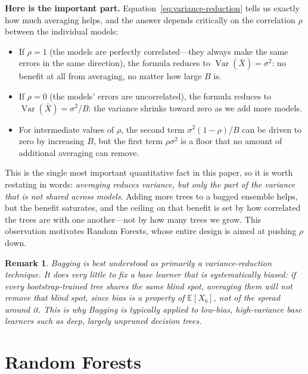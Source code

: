 \documentclass[12pt,a4paper]{article}
\newtheorem{remark}{Remark}[section]
\begin{document}
\textbf{Here is the important part.} Equation~\eqref{eq:variance-reduction} tells us exactly how much averaging helps, and the answer depends critically on the correlation $\rho$ between the individual models:

\begin{itemize}[nosep]
    \item If $\rho = 1$ (the models are perfectly correlated---they always make the same errors in the same direction), the formula reduces to $\operatorname{Var}(\bar X) = \sigma^2$: no benefit at all from averaging, no matter how large $B$ is.
    \item If $\rho = 0$ (the models' errors are uncorrelated), the formula reduces to $\operatorname{Var}(\bar X) = \sigma^2 / B$: the variance shrinks toward zero as we add more models.
    \item For intermediate values of $\rho$, the second term $\sigma^2(1-\rho)/B$ can be driven to zero by increasing $B$, but the first term $\rho \sigma^2$ is a floor that no amount of additional averaging can remove.
\end{itemize}

This is the single most important quantitative fact in this paper, so it is worth restating in words: \emph{averaging reduces variance, but only the part of the variance that is not shared across models}. Adding more trees to a bagged ensemble helps, but the benefit saturates, and the ceiling on that benefit is set by how correlated the trees are with one another---not by how many trees we grow. This observation motivates Random Forests, whose entire design is aimed at pushing $\rho$ down.

\begin{remark}
Bagging is best understood as primarily a \emph{variance-reduction} technique. It does very little to fix a base learner that is systematically biased: if every bootstrap-trained tree shares the same blind spot, averaging them will not remove that blind spot, since bias is a property of $\mathbb{E}[X_b]$, not of the spread around it. This is why Bagging is typically applied to low-bias, high-variance base learners such as deep, largely unpruned decision trees.
\end{remark}

\section{Random Forests}
\end{document}
